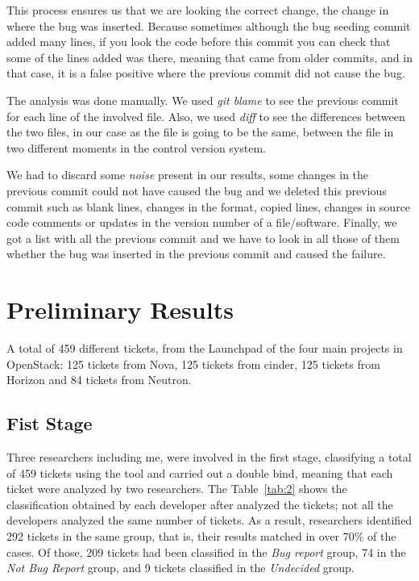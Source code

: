 \documentclass[ifip]{svmult}
\begin{document}
This process ensures us that we are looking the correct change, the change in where the bug was inserted. Because sometimes although the bug seeding commit added many lines, if you look the code before this commit you can check that some of the lines added was there, meaning that came from older commits, and in that case, it is a false positive where the previous commit did not cause the bug. 

The analysis was done manually. We used \textit{git blame} to see the previous commit for each line of the involved file. Also, we used \textit{diff} to see the differences between the two files, in our case as the file is going to be the same, between the file in two different moments in the control version system.

We had to discard some \emph{noise} present in our results, some changes in the previous commit could not have caused the bug and we deleted this previous commit such as blank lines, changes in the format, copied lines, changes in source code comments or updates in the version number of a file/software. Finally, we got a list with all the previous commit and we have to look in all those of them whether the bug was inserted in the previous commit and caused the failure.
\section{Preliminary Results}
\label{sec:results}

A total of 459 different tickets, from the Launchpad of the four main projects in OpenStack: 125 tickets from Nova, 125 tickets from cinder, 125 tickets from Horizon and 84 tickets from Neutron.

\subsection{Fist Stage}
\label{sec:resultsFS}

Three researchers including me, were involved in the first stage, classifying a total of 459 tickets using the tool and carried out a double bind, meaning that each ticket were analyzed by two researchers. The Table~\ref{tab:2} shows the classification obtained by each developer after analyzed the tickets; not all the developers analyzed the same number of tickets. As a result, researchers identified 292 tickets in the same group, that is, their results matched in over 70\% of the cases. Of those, 209 tickets had been classified in the \emph{Bug report} group, 74 in the \emph{Not Bug Report} group, and 9 tickets classified in the \emph{Undecided} group.
\end{document}
